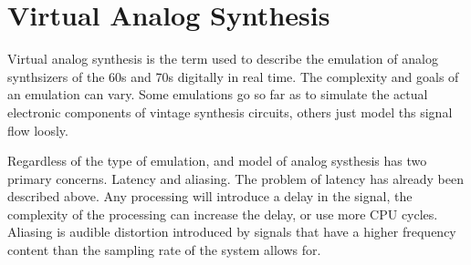 \section{Virtual Analog Synthesis}

Virtual analog synthesis is the term used to describe the emulation of analog synthsizers of the 60s and 70s digitally in real time. The complexity and goals of an emulation can vary. Some emulations go so far as to simulate the actual electronic components of vintage synthesis circuits, others just model ths signal flow loosly.

Regardless of the type of emulation, and model of analog systhesis has two primary concerns. Latency and aliasing. The problem of latency has already been described above. Any processing will introduce a delay in the signal, the complexity of the processing can increase the delay, or use more CPU cycles. Aliasing is audible distortion introduced by signals that have a higher frequency content than the sampling rate of the system allows for\cite{virtual_analog_synthesis}.

